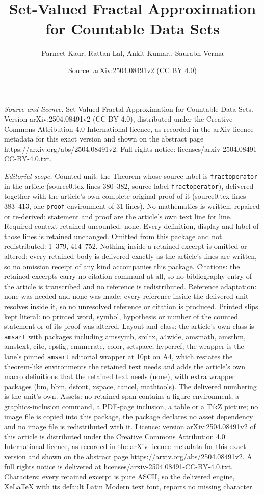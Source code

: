 \documentclass[10pt,a4paper]{amsart}
\title[Set-Valued Fractal Approximation for Countable Data Sets]{Set-Valued Fractal Approximation for Countable Data Sets}
\author{Parneet Kaur, Rattan Lal, Ankit Kumar,, Saurabh Verma}
\date{Source: arXiv:2504.08491v2 (CC BY 4.0)}
\begin{document}
\maketitle

\noindent\emph{Source and licence.} Set-Valued Fractal Approximation for Countable Data Sets. Version arXiv:2504.08491v2 (CC BY 4.0), distributed under the Creative Commons Attribution 4.0 International licence, as recorded in the arXiv licence metadata for this exact version and shown on the abstract page https://arxiv.org/abs/2504.08491v2. Full rights notice: licenses/arxiv-2504.08491-CC-BY-4.0.txt.\par\smallskip

\noindent\textit{Editorial scope.} Counted unit: the Theorem whose source label is \texttt{fractoperator} in the article (source0.tex lines 380--382, source label \texttt{fractoperator}), delivered together with the article's own complete original proof of it (source0.tex lines 383--413, one \texttt{proof} environment of 31 lines). No mathematics is written, repaired or re-derived: statement and proof are the article's own text line for line. Required context retained uncounted: none. Every definition, display and label of those lines is retained unchanged. Omitted from this package and not redistributed: 1--379, 414--752. Nothing inside a retained excerpt is omitted or altered: every retained body is delivered exactly as the article's lines are written, so no omission receipt of any kind accompanies this package. Citations: the retained excerpts carry no citation command at all, so no bibliography entry of the article is transcribed and no reference is redistributed. Reference adaptation: none was needed and none was made; every reference inside the delivered unit resolves inside it, so no unresolved reference or citation is produced. Printed slips kept literal: no printed word, symbol, hypothesis or number of the counted statement or of its proof was altered. Layout and class: the article's own class is \texttt{amsart} with packages including amssymb, srcltx, a4wide, amsmath, amsthm, amstext, cite, epsfig, enumerate, color, setspace, hyperref; the wrapper is the lane's pinned \texttt{amsart} editorial wrapper at 10pt on A4, which restates the theorem-like environments the retained text needs and adds the article's own macro definitions that the retained text needs (none), with extra wrapper packages (bm, bbm, dsfont, xspace, cancel, mathtools). The delivered numbering is the unit's own. Assets: no retained span contains a figure environment, a graphics-inclusion command, a PDF-page inclusion, a table or a TikZ picture; no image file is copied into this package, the package declares no asset dependency and no image file is redistributed with it. Licence: version arXiv:2504.08491v2 of this article is distributed under the Creative Commons Attribution 4.0 International licence, as recorded in the arXiv licence metadata for this exact version and shown on the abstract page https://arxiv.org/abs/2504.08491v2. A full rights notice is delivered at licenses/arxiv-2504.08491-CC-BY-4.0.txt. Characters: every retained excerpt is pure ASCII, so the delivered engine, XeLaTeX with its default Latin Modern text font, reports no missing character.
\end{document}
